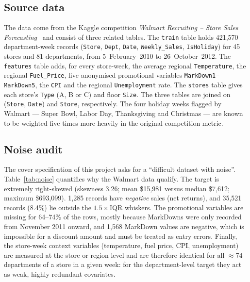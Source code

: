 \subsection{Source data}
The data come from the Kaggle competition \emph{Walmart Recruiting -- Store Sales Forecasting}~\cite{kaggle_walmart} and consist of three related tables. The \texttt{train} table holds 421{,}570 department-week records (\texttt{Store}, \texttt{Dept}, \texttt{Date}, \texttt{Weekly\_Sales}, \texttt{IsHoliday}) for 45 stores and 81 departments, from 5~February~2010 to 26~October~2012. The \texttt{features} table adds, for every store-week, the average regional \texttt{Temperature}, the regional \texttt{Fuel\_Price}, five anonymised promotional variables \texttt{MarkDown1}--\texttt{MarkDown5}, the \texttt{CPI} and the regional \texttt{Unemployment} rate. The \texttt{stores} table gives each store's \texttt{Type} (A, B or C) and floor \texttt{Size}. The three tables are joined on (\texttt{Store}, \texttt{Date}) and \texttt{Store}, respectively. The four holiday weeks flagged by Walmart --- Super Bowl, Labor Day, Thanksgiving and Christmas --- are known to be weighted five times more heavily in the original competition metric.

\subsection{Noise audit}
The cover specification of this project asks for a ``difficult dataset with noise''. Table~\ref{tab:noise} quantifies why the Walmart data qualify. The target is extremely right-skewed (skewness 3.26; mean \$15{,}981 versus median \$7{,}612; maximum \$693{,}099). 1{,}285 records have \emph{negative} sales (net returns), and 35{,}521 records (8.4\%) lie outside the $1.5\times$IQR whiskers. The promotional variables are missing for 64--74\% of the rows, mostly because MarkDowns were only recorded from November 2011 onward, and 1{,}568 MarkDown values are negative, which is impossible for a discount amount and must be treated as entry errors. Finally, the store-week context variables (temperature, fuel price, CPI, unemployment) are measured at the store or region level and are therefore identical for all $\approx$74 departments of a store in a given week: for the department-level target they act as weak, highly redundant covariates.

